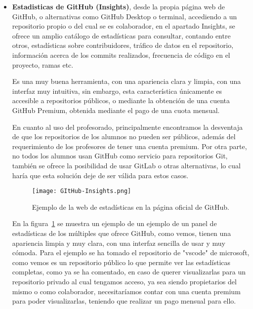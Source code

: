 \begin{itemize}

\item \textbf{Estadisticas de GitHub (Insights)}, desde la propia página
  web de GitHub, o alternativas como GitHub Desktop o terminal, accediendo
  a un repositorio propio o del cual se es colaborador, en el apartado
  Insights, se ofrece un amplio catálogo de estadísticas para consultar,
  contando entre otros, estadísticas sobre contribuidores, tráfico de datos
  en el repositorio, información acerca de los commits realizados,
  frecuencia de código en el proyecto, ramas etc.

  Es una muy buena herramienta, con una apariencia clara y limpia, con una
  interfaz muy intuitiva, sin embargo, esta característica únicamente es
  accesible a repositorios públicos, o mediante la obtención de una cuenta
  GitHub Premium, obtenida mediante el pago de una cuota mensual.

  En cuanto al uso del profesorado, principalmente encontramos la
  desventaja de que los repositorios de los alumnos no pueden ser públicos,
  además del requerimiento de los profesores de tener una cuenta premium.
  Por otra parte, no todos los alumnos usan GitHub como servicio para
  repositorios Git, también se ofrece la posibilidad de usar GitLab o otras
  alternativas, lo cual haría que esta solución deje de ser válida para
  estos casos.



  \begin{figure}[h!]
    \texttt{[image: GItHub-Insights.png]}
    \caption{Ejemplo de la web de estadísticas en la página oficial de
      GitHub.}
    \label{figure:GithubInsights}
  \end{figure}

  En la figura~\ref{figure:GithubInsights} se muestra un ejemplo de un
  ejemplo de un panel de estadísticas de los múltiples que ofrece GitHub,
  como vemos, tienen una apariencia limpia y muy clara, con una interfaz
  sencilla de usar y muy cómoda. Para el ejemplo se ha tomado el
  repositorio de "vscode" de microsoft, como vemos es un repositorio
  público lo que permite ver las estadísticas completas, como ya se ha
  comentado, en caso de querer visualizarlas para un repositorio privado al
  cual tengamos acceso, ya sea siendo propietarios del mismo o como
  colaborador, necesitaríamos contar con una cuenta premium para poder
  visualizarlas, teniendo que realizar un pago mensual para ello.


\end{itemize}
